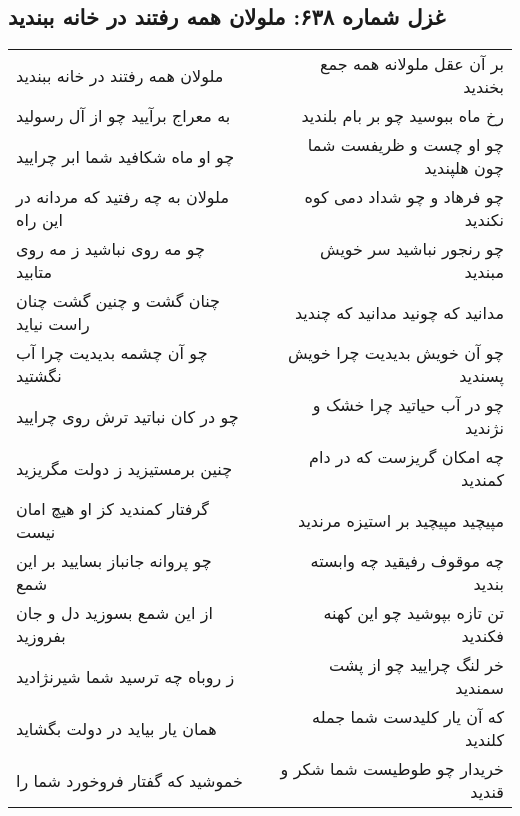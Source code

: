 \begin{center}
\section*{غزل شماره ۶۳۸: ملولان همه رفتند در خانه ببندید}
\label{sec:0638}
\begin{longtable}{l p{0.5cm} r}
ملولان همه رفتند در خانه ببندید
&&
بر آن عقل ملولانه همه جمع بخندید
\\
به معراج برآیید چو از آل رسولید
&&
رخ ماه ببوسید چو بر بام بلندید
\\
چو او ماه شکافید شما ابر چرایید
&&
چو او چست و ظریفست شما چون هلپندید
\\
ملولان به چه رفتید که مردانه در این راه
&&
چو فرهاد و چو شداد دمی کوه نکندید
\\
چو مه روی نباشید ز مه روی متابید
&&
چو رنجور نباشید سر خویش مبندید
\\
چنان گشت و چنین گشت چنان راست نیاید
&&
مدانید که چونید مدانید که چندید
\\
چو آن چشمه بدیدیت چرا آب نگشتید
&&
چو آن خویش بدیدیت چرا خویش پسندید
\\
چو در کان نباتید ترش روی چرایید
&&
چو در آب حیاتید چرا خشک و نژندید
\\
چنین برمستیزید ز دولت مگریزید
&&
چه امکان گریزست که در دام کمندید
\\
گرفتار کمندید کز او هیچ امان نیست
&&
مپیچید مپیچید بر استیزه مرندید
\\
چو پروانه جانباز بسایید بر این شمع
&&
چه موقوف رفیقید چه وابسته بندید
\\
از این شمع بسوزید دل و جان بفروزید
&&
تن تازه بپوشید چو این کهنه فکندید
\\
ز روباه چه ترسید شما شیرنژادید
&&
خر لنگ چرایید چو از پشت سمندید
\\
همان یار بیاید در دولت بگشاید
&&
که آن یار کلیدست شما جمله کلندید
\\
خموشید که گفتار فروخورد شما را
&&
خریدار چو طوطیست شما شکر و قندید
\\
\end{longtable}
\end{center}
